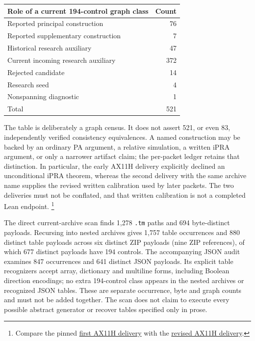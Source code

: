 \begin{center}
\begin{tabular}{lr}
\toprule
Role of a current 194-control graph class & Count\\
\midrule
Reported principal construction & 76\\
Reported supplementary construction & 7\\
Historical research auxiliary & 47\\
Current incoming research auxiliary & 372\\
Rejected candidate & 14\\
Research seed & 4\\
Nonspanning diagnostic & 1\\
\midrule
Total & 521\\
\bottomrule
\end{tabular}
\end{center}

The table is deliberately a graph census.  It does not assert 521, or even
83, independently verified consistency equivalences.  A named construction
may be backed by an ordinary PA argument, a relative simulation, a written
\(\mathrm{iPRA}\) argument, or only a narrower artifact claim; the per-packet
ledger retains that distinction.  In particular, the early AX11H delivery
explicitly declined an unconditional \(\mathrm{iPRA}\) theorem, whereas the
second delivery with the same archive name supplies the revised written
calibration used by later packets.  The two deliveries must not be
conflated, and that written calibration is not a completed Lean endpoint.
\footnote{Compare the pinned \href{https://github.com/VladimirReshetnikov/ProveIt/blob/793c68737d94bffa4e32a75bce6cc8058d6d22f0/Computability/BusyBeaver/Research/PA/docs/pa194_ax11h_research_2026-11-14/README.md}{first AX11H delivery} with the \href{https://github.com/VladimirReshetnikov/ProveIt/blob/793c68737d94bffa4e32a75bce6cc8058d6d22f0/Computability/BusyBeaver/Research/PA/docs/pa194_ax11h_research_2026-11-14_2/README.md}{revised AX11H delivery}.}

The direct current-archive scan finds 1,278 \texttt{.tm} paths and 694
byte-distinct payloads.  Recursing into nested archives gives 1,757 table
occurrences and 880 distinct table payloads across six distinct ZIP payloads
(nine ZIP references), of which 677 distinct payloads have 194 controls.
The accompanying JSON audit examines 847 occurrences and 641 distinct JSON
payloads.  Its explicit table recognizers accept array, dictionary and
multiline forms, including Boolean direction encodings; no extra
194-control class appears in the nested archives or recognized JSON tables.
These are separate occurrence, byte and graph counts and must not be added
together.  The scan does not claim to execute every possible abstract
generator or recover tables specified only in prose.


